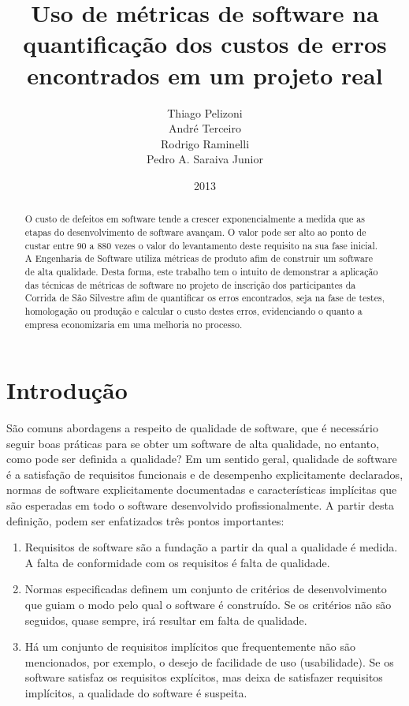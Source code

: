 \documentclass[11pt, a4paper]{article}
\title{Uso de métricas de software na quantificação dos custos de erros encontrados em um projeto real}
\author{
	Thiago Pelizoni \\
	André Terceiro \\
	Rodrigo Raminelli \\
	Pedro A. Saraiva Junior
}
\date{2013}
\begin{document}
\maketitle

\begin{abstract}
O custo de defeitos em software tende a crescer exponencialmente a medida que as etapas do desenvolvimento de software avançam. O valor pode ser alto ao ponto de custar entre 90 a 880 vezes o valor do levantamento deste requisito na sua fase inicial.\cite[p. 37]{NISL} A Engenharia de Software utiliza métricas de produto afim de construir um software de alta qualidade. Desta forma, este trabalho tem o intuito de demonstrar a aplicação das técnicas de métricas de software no projeto de inscrição dos participantes da Corrida de São Silvestre afim de quantificar os erros encontrados, seja na fase de testes, homologação ou produção e calcular o custo destes erros, evidenciando o quanto a empresa economizaria em uma melhoria no processo.


\end{abstract}


\section{Introdução}
São comuns abordagens a respeito de qualidade de software, que é necessário seguir boas práticas para se obter um software de alta qualidade, no entanto, como pode ser definida a qualidade? Em um sentido geral, qualidade de software é a satisfação de requisitos funcionais e de desempenho explicitamente declarados, normas de software explicitamente documentadas e características implícitas que são esperadas em todo o software desenvolvido profissionalmente. A partir desta definição, podem ser enfatizados três pontos importantes:

\begin{enumerate}
	\item Requisitos de software são a fundação a partir da qual a qualidade é medida. A falta de conformidade com os requisitos é falta de qualidade.
	\item Normas especificadas definem um conjunto de critérios de desenvolvimento que guiam o modo pelo qual o software é construído. Se os critérios não são seguidos, quase sempre, irá resultar em falta de qualidade.
	\item Há um conjunto de requisitos implícitos que frequentemente não são mencionados, por exemplo, o desejo de facilidade de uso (usabilidade). Se os software satisfaz os requisitos explícitos, mas deixa de satisfazer requisitos implícitos, a qualidade do software é suspeita.
\end{enumerate}
\cite[p.349]{pressman}
\end{document}
